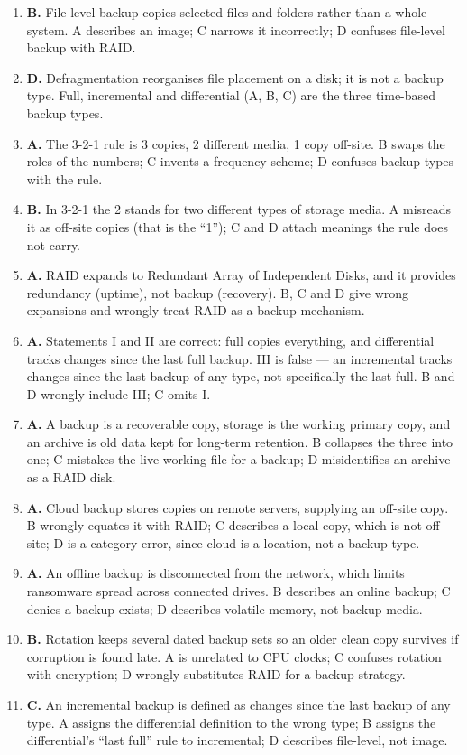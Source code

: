 \documentclass[11pt]{article}
\begin{document}
\begin{enumerate}[label=\textbf{Q\arabic*.}, leftmargin=*]
  settings and data. A and D describe narrow copies; C describes a
  differential, not an image.
\item \textbf{B.} File-level backup copies selected files and folders rather
  than a whole system. A describes an image; C narrows it incorrectly; D
  confuses file-level backup with RAID.
\item \textbf{D.} Defragmentation reorganises file placement on a disk; it is
  not a backup type. Full, incremental and differential (A, B, C) are the
  three time-based backup types.
\item \textbf{A.} The 3-2-1 rule is 3 copies, 2 different media, 1 copy
  off-site. B swaps the roles of the numbers; C invents a frequency scheme; D
  confuses backup types with the rule.
\item \textbf{B.} In 3-2-1 the 2 stands for two different types of storage
  media. A misreads it as off-site copies (that is the ``1''); C and D attach
  meanings the rule does not carry.
\item \textbf{A.} RAID expands to Redundant Array of Independent Disks, and it
  provides redundancy (uptime), not backup (recovery). B, C and D give wrong
  expansions and wrongly treat RAID as a backup mechanism.
\item \textbf{A.} Statements I and II are correct: full copies everything, and
  differential tracks changes since the last full backup. III is false --- an
  incremental tracks changes since the last backup of any type, not
  specifically the last full. B and D wrongly include III; C omits I.
\item \textbf{A.} A backup is a recoverable copy, storage is the working
  primary copy, and an archive is old data kept for long-term retention. B
  collapses the three into one; C mistakes the live working file for a
  backup; D misidentifies an archive as a RAID disk.
\item \textbf{A.} Cloud backup stores copies on remote servers, supplying an
  off-site copy. B wrongly equates it with RAID; C describes a local copy,
  which is not off-site; D is a category error, since cloud is a location,
  not a backup type.
\item \textbf{A.} An offline backup is disconnected from the network, which
  limits ransomware spread across connected drives. B describes an online
  backup; C denies a backup exists; D describes volatile memory, not backup
  media.
\item \textbf{B.} Rotation keeps several dated backup sets so an older clean
  copy survives if corruption is found late. A is unrelated to CPU clocks; C
  confuses rotation with encryption; D wrongly substitutes RAID for a backup
  strategy.
\item \textbf{C.} An incremental backup is defined as changes since the last
  backup of any type. A assigns the differential definition to the wrong
  type; B assigns the differential's ``last full'' rule to incremental; D
  describes file-level, not image.


\end{enumerate}
\end{document}
